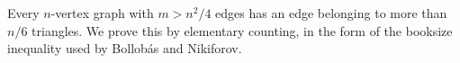 Every \(n\)-vertex graph with \(m>n^2/4\) edges has an
edge belonging to more than \(n/6\) triangles.
We prove this by elementary counting, in the form of
the booksize inequality used by Bollob\'as and Nikiforov.
